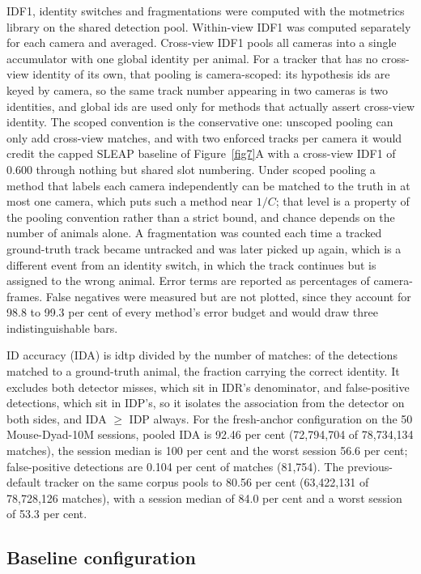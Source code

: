 \documentclass[pdflatex, sn-nature]{sn-jnl}
\theoremstyle{thmstyleone}%
\theoremstyle{thmstyletwo}%
\theoremstyle{thmstylethree}%
\begin{document}
IDF1, identity switches and fragmentations were computed with the motmetrics library on the shared detection pool. Within-view IDF1 was computed separately for each camera and averaged. Cross-view IDF1 pools all cameras into a single accumulator with one global identity per animal. For a tracker that has no cross-view identity of its own, that pooling is camera-scoped: its hypothesis ids are keyed by camera, so the same track number appearing in two cameras is two identities, and global ids are used only for methods that actually assert cross-view identity. The scoped convention is the conservative one: unscoped pooling can only add cross-view matches, and with two enforced tracks per camera it would credit the capped SLEAP baseline of Figure~\ref{fig7}A with a cross-view IDF1 of 0.600 through nothing but shared slot numbering. Under scoped pooling a method that labels each camera independently can be matched to the truth in at most one camera, which puts such a method near $1/C$; that level is a property of the pooling convention rather than a strict bound, and chance depends on the number of animals alone. A fragmentation was counted each time a tracked ground-truth track became untracked and was later picked up again, which is a different event from an identity switch, in which the track continues but is assigned to the wrong animal. Error terms are reported as percentages of camera-frames. False negatives were measured but are not plotted, since they account for 98.8 to 99.3 per cent of every method's error budget and would draw three indistinguishable bars.

ID accuracy (IDA) is idtp divided by the number of matches: of the detections matched to a ground-truth animal, the fraction carrying the correct identity. It excludes both detector misses, which sit in IDR's denominator, and false-positive detections, which sit in IDP's, so it isolates the association from the detector on both sides, and IDA $\geq$ IDP always. For the fresh-anchor configuration on the 50 Mouse-Dyad-10M sessions, pooled IDA is 92.46 per cent (72,794,704 of 78,734,134 matches), the session median is 100 per cent and the worst session 56.6 per cent; false-positive detections are 0.104 per cent of matches (81,754). The previous-default tracker on the same corpus pools to 80.56 per cent (63,422,131 of 78,728,126 matches), with a session median of 84.0 per cent and a worst session of 53.3 per cent.

\subsection{Baseline configuration}\label{methods-baseline}
\end{document}
